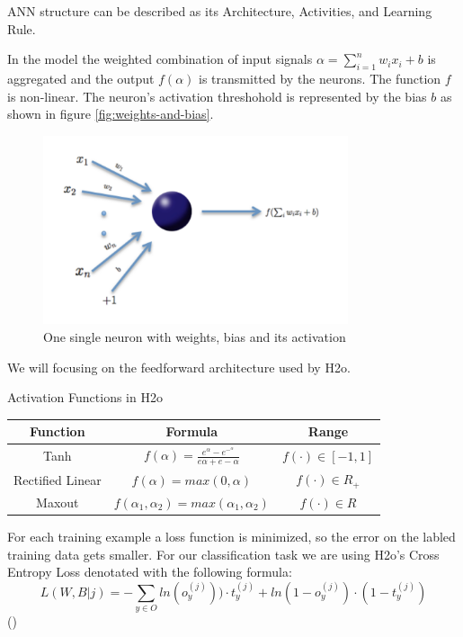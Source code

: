 \documentclass[]{article}
\begin{document}
ANN structure can be described as its Architecture, Activities, and
Learning Rule.

In the model the weighted combination of input signals
\(α =\sum_{i=1}^n w_ix_i+b\) is aggregated and the output \(f(α)\) is
transmitted by the neurons. The function \(f\) is non-linear. The
neuron's activation threshohold is represented by the bias \(b\) as
shown in figure \ref{fig:weights-and-bias}.

\begin{figure}
    \centering
    \includegraphics[width=0.8\textwidth]{images/weights-and-bias.png}
    \caption{One single neuron with weights, bias and its activation}
    \label{fig:ann}
\end{figure}

We will focusing on the feedforward architecture used by H2o.

\begin{center}
Activation Functions in H2o
 \begin{tabular}{| c |  c | c|} 
 \hline
 Function & Formula & Range \\ [0.5ex] 
 \hline
 \hline
Tanh &  \(f(α) =\frac{e^α−e^{−^α}} {eα+e−α}\) & \(f(·) ∈ [−1, 1]\) \\ 
Rectified Linear & \(f(α) = max(0, α)\) & \(f(·) ∈ R_+\) \\ 
Maxout & \(f(α_1, α_2) = max(α_1, α_2)\) &  \(f(·) ∈ R\) \\
 \hline
\end{tabular}
\end{center}

For each training example a loss function is minimized, so the error on
the labled training data gets smaller. For our classification task we
are using H2o's Cross Entropy Loss denotated with the following formula:
\[
L(W, B|j) = − \sum_{y∈O} ln(o^{(j)}_y)) · t^{(j)}_y + ln(1 - o^{(j)}_y)· (1 - t^{(j)}_y)
\] (\cite{h2oDL})
\end{document}
